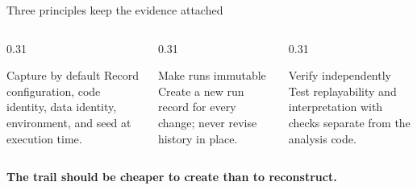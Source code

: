 \begin{frame}{Three principles keep the evidence attached}
  \begin{columns}[T,onlytextwidth]
    \begin{column}{0.31\textwidth}
      \begin{block}{Capture by default}
        Record configuration, code identity, data identity, environment, and seed
        at execution time.
      \end{block}
    \end{column}
    \begin{column}{0.31\textwidth}
      \begin{block}{Make runs immutable}
        Create a new run record for every change; never revise history in place.
      \end{block}
    \end{column}
    \begin{column}{0.31\textwidth}
      \begin{block}{Verify independently}
        Test replayability and interpretation with checks separate from the analysis
        code.
      \end{block}
    \end{column}
  \end{columns}

  \vfill
  \centering
  \color{SzegedBlue}\large\bfseries
  The trail should be cheaper to create than to reconstruct.
\end{frame}
